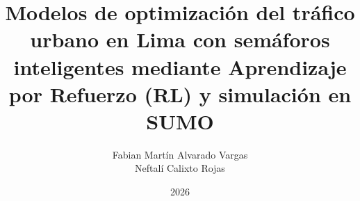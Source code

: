 \documentclass[a4paper,12pt,oneside]{tesisutec}
\begin{document}
\frontmatter


\title{Modelos de optimización del tráfico urbano en Lima con semáforos inteligentes mediante Aprendizaje por Refuerzo (RL) y simulación en SUMO}

\author{Fabian Martín Alvarado Vargas  \\ Neftalí Calixto Rojas }

\date{2026}

\maketitle


%
%

\tableofcontents
\newpage
\listoftables
\newpage
\listoffigures


\mainmatter
\pagestyle{fancy}












\renewcommand{\bibname}{\hfill\Large\bf{REFERENCIAS BIBLIOGRÁFICAS}\hfill}

\clearpage
{}
{}




\end{document}
